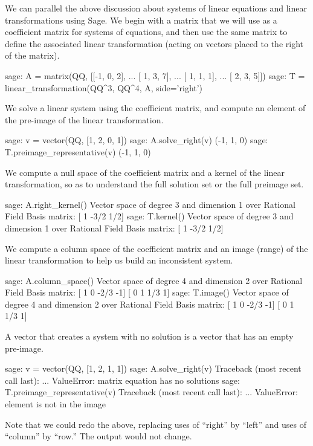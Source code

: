 We can parallel the above discussion about systems of linear equations and linear transformations using Sage.  We begin with a matrix that we will use as a coefficient matrix for systems of equations, and then use the same matrix to define the associated linear transformation (acting on vectors placed to the right of the matrix).
%
\begin{sageexample}
sage: A = matrix(QQ, [[-1, 0, 2],
...                   [ 1, 3, 7],
...                   [ 1, 1, 1],
...                   [ 2, 3, 5]])
sage: T = linear_transformation(QQ^3, QQ^4, A, side='right')
\end{sageexample}
%
We solve a linear system using the coefficient matrix, and compute an element of the pre-image of the linear transformation.
%
\begin{sageexample}
sage: v = vector(QQ, [1, 2, 0, 1])
sage: A.solve_right(v)
(-1, 1, 0)
sage: T.preimage_representative(v)
(-1, 1, 0)
\end{sageexample}
%
We compute a null space of the coefficient matrix and a kernel of the linear transformation, so as to understand the full solution set or the full preimage set.
%
\begin{sageexample}
sage: A.right_kernel()
Vector space of degree 3 and dimension 1 over Rational Field
Basis matrix:
[   1 -3/2  1/2]
sage: T.kernel()
Vector space of degree 3 and dimension 1 over Rational Field
Basis matrix:
[   1 -3/2  1/2]
\end{sageexample}
%
We compute a column space of the coefficient matrix and an image (range) of the linear transformation to help us build an inconsistent system.
%
\begin{sageexample}
sage: A.column_space()
Vector space of degree 4 and dimension 2 over Rational Field
Basis matrix:
[   1    0 -2/3   -1]
[   0    1  1/3    1]
sage: T.image()
Vector space of degree 4 and dimension 2 over Rational Field
Basis matrix:
[   1    0 -2/3   -1]
[   0    1  1/3    1]
\end{sageexample}
%
A vector that creates a system with no solution is a vector that has an empty pre-image.
%
\begin{sageexample}
sage: v = vector(QQ, [1, 2, 1, 1])
sage: A.solve_right(v)
Traceback (most recent call last):
...
ValueError: matrix equation has no solutions
sage: T.preimage_representative(v)
Traceback (most recent call last):
...
ValueError: element is not in the image
\end{sageexample}
%
Note that we could redo the above, replacing uses of ``right'' by ``left'' and uses of ``column'' by ``row.''  The output would not change.\par
